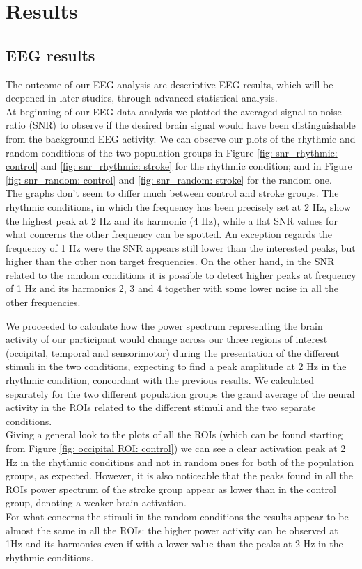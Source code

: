 \chapter{Results}
\section{EEG results}
The outcome of our EEG analysis are descriptive EEG results, which will be deepened in later studies, through advanced statistical analysis.\\ 
At beginning of our EEG data analysis we plotted the averaged signal-to-noise ratio (SNR) to observe if the desired brain signal would have been distinguishable from the background EEG activity. We can observe our plots of the rhythmic and random conditions of the two population groups in Figure \ref{fig: snr_rhythmic: control} and \ref{fig: snr_rhythmic: stroke} for the rhythmic condition; and in Figure \ref{fig: snr_random: control} and \ref{fig: snr_random: stroke} for the random one. \\
The graphs don't seem to differ much between control and stroke groups. The rhythmic conditions, in which the frequency has been precisely set at 2 Hz, show the highest peak at 2 Hz and its harmonic (4 Hz), while a flat SNR values for what concerns the other frequency can be spotted. An exception regards the frequency of 1 Hz were the SNR appears still lower than the interested peaks, but higher than the other non target frequencies. On the other hand, in the SNR related to the random conditions it is possible to detect higher peaks at frequency of 1 Hz and its harmonics 2, 3 and 4 together with some lower noise in all the other frequencies. 

We proceeded to calculate how the power spectrum representing the brain activity of our participant would change across our three regions of interest (occipital, temporal and sensorimotor) during the presentation of the different stimuli in the two conditions, expecting to find a peak amplitude at 2 Hz in the rhythmic condition, concordant with the previous results. We calculated separately for the two different population groups the grand average of the neural activity in the ROIs related to the different stimuli and the two separate conditions. \\
Giving a general look to the plots of all the ROIs (which can be found starting from Figure \ref{fig: occipital ROI: control}) we can see a clear activation peak at 2 Hz in the rhythmic conditions and not in random ones for both of the population groups, as expected. However, it is also noticeable that the peaks found in all the ROIs power spectrum of the stroke group appear as lower than in the control group, denoting a weaker brain activation. \\
For what concerns the stimuli in the random conditions the results appear to be almost the same in all the ROIs: the higher power activity can be observed at 1Hz and its harmonics even if with a lower value than the peaks at 2 Hz in the rhythmic conditions.

